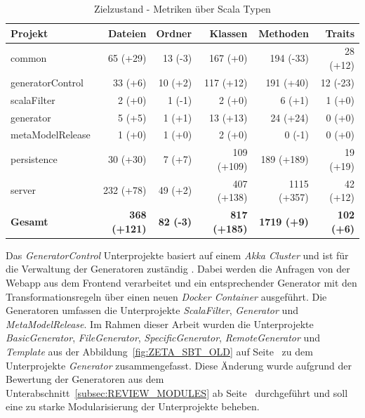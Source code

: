 \begin{table}[ht]
    \smallskip
    \centering
    \begin{tabular}{| l | r | r | r | r | r |}
    \hline
    \bf Projekt & \bf Dateien & \bf Ordner & \bf Klassen & \bf Methoden & \bf Traits \\ \hline
    common & 65 (+29) & 13 (-3) & 167 (+0) & 194 (-33) & 28 (+12) \\ \hline
    generatorControl & 33 (+6) & 10 (+2) & 117 (+12) & 191 (+40) & 12 (-23) \\ \hline
    scalaFilter & 2 (+0) & 1 (-1) & 2 (+0) & 6 (+1) & 1 (+0) \\ \hline
    generator & 5 (+5) & 1 (+1) & 13 (+13) & 24 (+24) & 0 (+0) \\ \hline
    metaModelRelease & 1 (+0) & 1 (+0) & 2 (+0) & 0 (-1) & 0 (+0) \\ \hline
    persistence & 30 (+30) & 7 (+7) & 109 (+109) & 189 (+189) & 19 (+19) \\ \hline
    server & 232 (+78) & 49 (+2) & 407 (+138) & 1115 (+357) & 42 (+12)  \\ \hline
    \bf Gesamt & \bf 368 (+121) & \bf 82 (-3) & \bf 817 (+185) & \bf 1719 (+9) & \bf 102 (+6) \\ \hline
    \end{tabular}
    \caption{Zielzustand - Metriken über Scala Typen \cite{analys_new_directory}}
    \label{tab:ZETA_METRICS_NEW}
\end{table}

Das \textit{GeneratorControl} Unterprojekte basiert auf einem \textit{Akka Cluster} und ist für die Verwaltung der Generatoren zuständig \cite{akka_cluster}. Dabei werden die Anfragen von der Webapp aus dem Frontend verarbeitet und ein entsprechender Generator mit den Transformationsregeln über einen neuen \textit{Docker Container} ausgeführt. Die Generatoren umfassen die Unterprojekte \textit{ScalaFilter}, \textit{Generator} und \textit{MetaModelRelease}. Im Rahmen dieser Arbeit wurden die Unterprojekte \textit{BasicGenerator}, \textit{FileGenerator}, \textit{SpecificGenerator}, \textit{RemoteGenerator} und \textit{Template} aus der Abbildung~\ref{fig:ZETA_SBT_OLD} auf Seite~\pageref{fig:ZETA_SBT_OLD} zu dem Unterprojekte \textit{Generator} zusammengefasst. Diese Änderung wurde aufgrund der Bewertung der Generatoren aus dem Unterabschnitt~\ref{subsec:REVIEW_MODULES} ab Seite~\pageref{subsec:REVIEW_MODULES} durchgeführt und soll eine zu starke Modularisierung der Unterprojekte beheben.


